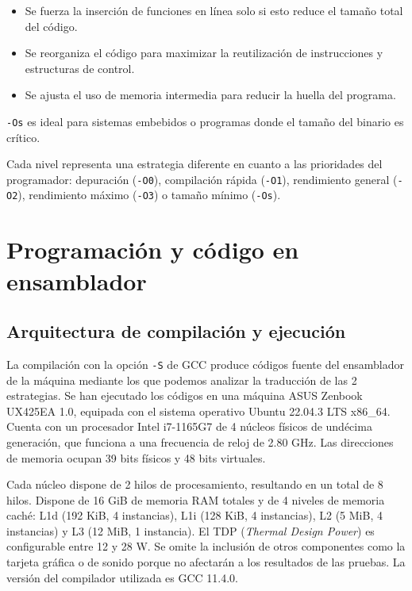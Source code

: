 \documentclass[11pt,a4paper,twoside]{article}
\theoremstyle{definition}
\begin{document}
	\begin{itemize}
		\item Se fuerza la inserción de funciones en línea solo si esto reduce el tamaño total del código.
		\item Se reorganiza el código para maximizar la reutilización de instrucciones y estructuras de control.
		\item Se ajusta el uso de memoria intermedia para reducir la huella del programa.
	\end{itemize}

	\texttt{-Os} es ideal para sistemas embebidos o programas donde el tamaño del binario es crítico.
	
	Cada nivel representa una estrategia diferente en cuanto a las prioridades del programador: depuración (\texttt{-O0}), compilación rápida (\texttt{-O1}), rendimiento general (\texttt{-O2}), rendimiento máximo (\texttt{-O3}) o tamaño mínimo (\texttt{-Os}).
	
	\section{Programación y código en ensamblador}
	
	\subsection{Arquitectura de compilación y ejecución}
	
	La compilación con la opción \texttt{-S} de GCC produce códigos fuente del ensamblador de la máquina mediante los que podemos analizar la traducción de las 2 estrategias. Se han ejecutado los códigos en una máquina ASUS Zenbook UX425EA 1.0, equipada con el sistema operativo Ubuntu 22.04.3 LTS x86\_64. Cuenta con un procesador Intel i7-1165G7 de 4 núcleos físicos de undécima generación, que funciona a una frecuencia de reloj de 2.80 GHz. Las direcciones de memoria ocupan 39 bits físicos y 48 bits virtuales.
	
	Cada núcleo dispone de 2 hilos de procesamiento, resultando en un total de 8 hilos. Dispone de 16 GiB de memoria RAM totales y de 4 niveles de memoria caché: L1d (192 KiB, 4 instancias), L1i (128 KiB, 4 instancias), L2 (5 MiB, 4 instancias) y L3 (12 MiB, 1 instancia). El TDP (\textit{Thermal Design Power}) es configurable entre 12 y 28 W. Se omite la inclusión de otros componentes como la tarjeta gráfica o de sonido porque no afectarán a los resultados de las pruebas. La versión del compilador utilizada es GCC 11.4.0.
\end{document}
